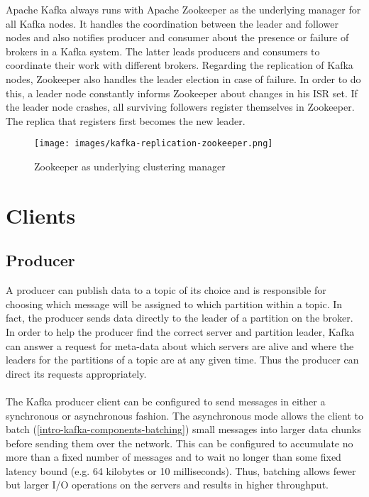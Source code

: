 Apache Kafka always runs with Apache Zookeeper as the underlying manager for all
Kafka nodes. It handles the coordination between the leader and follower nodes
and also notifies producer and consumer about the presence or failure of brokers in a
Kafka system. The latter leads producers and consumers to coordinate their work
with different brokers. Regarding the replication of Kafka nodes, Zookeeper
also handles the leader election in case of failure. In order to do this, a leader node
constantly informs Zookeeper about changes in his ISR set. If the leader node
crashes, all surviving followers register themselves in Zookeeper. The replica that
registers first becomes the new leader. \cite{kafka-wiki-replication}
\cite{ArtKafkaInfoQ} \cite{apacheZookeeper}

\begin{figure}[H]
    \centering
    \texttt{[image: images/kafka-replication-zookeeper.png]}
    \caption{Zookeeper as underlying clustering manager \cite{ArtKafkaInfoQ}}
    \label{fig:the-log}
\end{figure}

\section{Clients}

\subsection{Producer}

A producer can publish data to a topic of its choice and is responsible for
choosing which message will be assigned to which partition within a topic. In
fact, the producer sends data directly to the leader of a partition on the
broker. In order to help the producer find the correct server and partition
leader, Kafka can answer a request for meta-data about which servers are alive
and where the leaders for the partitions of a topic are at any given time. Thus
the producer can direct its requests appropriately. \cite{apachekafka}
\\ \\
The Kafka producer client can be configured to send messages in either a
synchronous or asynchronous fashion. The asynchronous mode allows the client to
batch (\ref{intro-kafka-components-batching}) small messages into larger data
chunks before sending them over the network. This can be configured to accumulate
no more than a fixed number of messages and to wait no longer than some fixed
latency bound (e.g. 64 kilobytes or 10 milliseconds). Thus, batching allows
fewer but larger I/O operations on the servers and results in higher throughput.
\cite{apachekafka} \cite{goodhope2012building}

